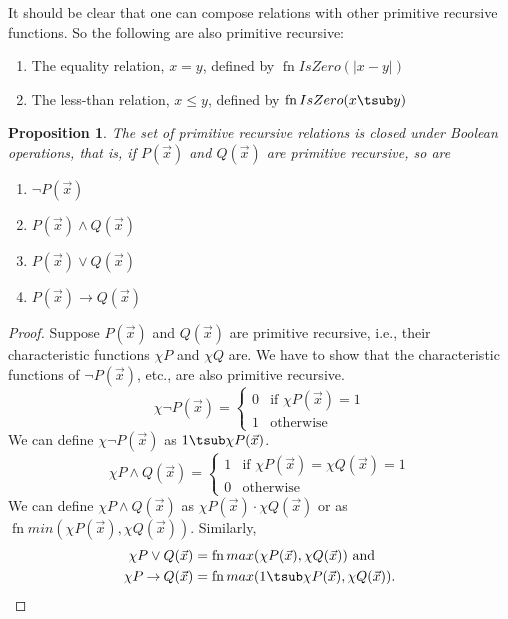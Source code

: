 \documentclass[10pt,a4paper]{article}
\theoremstyle{plain}
\newtheorem{prop}[thm]{Proposition}
\theoremstyle{definition}
\theoremstyle{remark}
\providecommand{\lif}{\mathbin{\rightarrow}}
\providecommand{\Char}{\chi}
\providecommand{\fn}{\operatorname{fn}}
\begin{document}
It should be clear that one can compose relations with other primitive
recursive functions. So the following are also primitive recursive:
\begin{enumerate}
\item The equality relation, $x = y$, defined by $\fn{IsZero}(\left|x -
  y\right|)$
\item The less-than relation, $x \leq y$, defined by $\fn{IsZero}(x
  \tsub y)$
\end{enumerate}


\begin{prop}
  The set of primitive recursive relations is closed under Boolean
  operations, that is, 
  if $P(\vec x)$ and $Q(\vec x)$ are primitive recursive, so are
  \begin{enumerate}
  \item $\lnot P(\vec x)$
  \item $P(\vec x) \land Q(\vec x)$
  \item $P(\vec x) \lor Q(\vec x)$
  \item $P(\vec x) \lif Q(\vec x)$
  \end{enumerate}
\end{prop}

\begin{proof}
  Suppose $P(\vec x)$ and $Q(\vec x)$ are primitive recursive, i.e.,
  their characteristic functions $\Char{P}$ and $\Char{Q}$ are.  We
  have to show that the characteristic functions of $\lnot P(\vec x)$,
  etc., are also primitive recursive.
  \[
  \Char{\lnot P}(\vec x) = \begin{cases}
    0 & \text{if $\Char{P}(\vec x) = 1$}\\
    1 & \text{otherwise}
  \end{cases}
  \]
  We can define $\Char{\lnot P}(\vec x)$ as $1 \tsub \Char{P}(\vec x)$.
  \[
  \Char{P \land Q}(\vec x) = \begin{cases}
    1 & \text{if $\Char{P}(\vec x) = \Char{Q}(\vec x) = 1$}\\
    0 & \text{otherwise}
  \end{cases}
  \]
  We can define $\Char{P \land Q}(\vec x)$ as $\Char{P}(\vec x) \cdot
  \Char{Q}(\vec x)$ or as $\fn{min}(\Char{P}(\vec x), \Char{Q}(\vec
  x))$. Similarly, 
  \begin{align*}
    \Char{P \lor Q}(\vec x) & = \fn{max}(\Char{P}(\vec x), \Char{Q}(\vec x)) \text{ and}\\
    \Char{P \lif Q}(\vec x) & = \fn{max}(1 \tsub
  \Char{P}(\vec x), \Char{Q}(\vec x)).
  \end{align*}
\end{proof}
\end{document}
